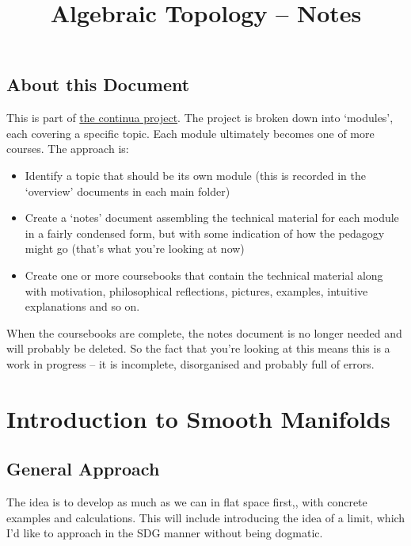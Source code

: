 \documentclass[oneside,english]{amsbook}
\numberwithin{section}{chapter}
\theoremstyle{plain}
\theoremstyle{definition}
\begin{document}
	
	\title{Algebraic Topology -- Notes}
	
	\maketitle
	
	\tableofcontents
	
	\chapter*{About this Document}
	
	This is part of \href{https://github.com/FineArtMaths/continua}{the continua project}. The project is broken down into `modules', each covering a specific topic. Each module ultimately becomes one of more courses. The approach is:
	
	\begin{itemize}
		\item{Identify a topic that should be its own module (this is recorded in the `overview' documents in each main folder)}
		\item{Create a `notes' document assembling the technical material for each module in a fairly condensed form, but with some indication of how the pedagogy might go (that's what you're looking at now)}
		\item{Create one or more coursebooks that contain the technical material along with motivation, philosophical reflections, pictures, examples, intuitive explanations and so on.}
	\end{itemize}
	
	When the coursebooks are complete, the notes document is no longer needed and will probably be deleted. So the fact that you're looking at this means this is a work in progress -- it is incomplete, disorganised and probably full of errors.
	
	\part{Introduction to Smooth Manifolds}
	
	\chapter*{General Approach}
	
	The idea is to develop as much as we can in flat space first,, with concrete examples and calculations. This will include introducing the idea of a limit, which I'd like to approach in the SDG manner without being dogmatic.
	
\end{document}

